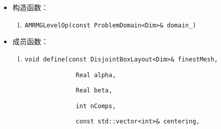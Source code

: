 \documentclass[cn, bibend=bibtex]{elegantpaper}
\theoremstyle{plain}
\begin{document}
\begin{itemize}




      


      
  \item 构造函数：
  \begin{enumerate}
    \item \lstinline|AMRMGLevelOp(const ProblemDomain<Dim>& domain_)|
  \end{enumerate}
  \item 成员函数：
  \begin{enumerate}    
    \item \lstinline|void define(const DisjointBoxLayout<Dim>& finestMesh, |
    
    \lstinline|              Real alpha, |
    
    \lstinline|              Real beta, |

    \lstinline|              int nComps, |

    \lstinline|              const std::vector<int>& centering,|


\end{enumerate}
\end{itemize}
\end{document}
